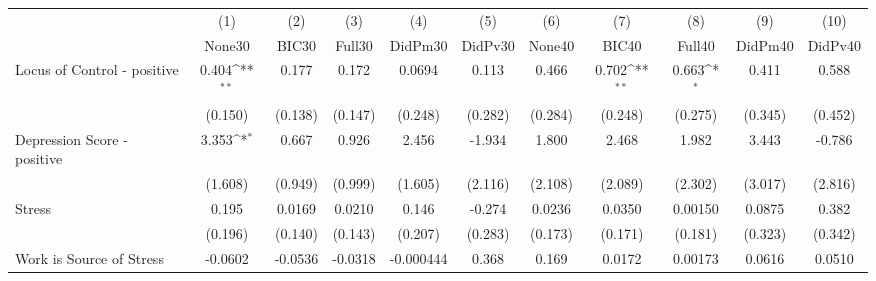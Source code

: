{
\def\sym#1{\ifmmode^{#1}\else\(^{#1}\)\fi}
\begin{tabular}{l*{10}{c}}
\toprule
            &\multicolumn{1}{c}{(1)}&\multicolumn{1}{c}{(2)}&\multicolumn{1}{c}{(3)}&\multicolumn{1}{c}{(4)}&\multicolumn{1}{c}{(5)}&\multicolumn{1}{c}{(6)}&\multicolumn{1}{c}{(7)}&\multicolumn{1}{c}{(8)}&\multicolumn{1}{c}{(9)}&\multicolumn{1}{c}{(10)}\\
            &\multicolumn{1}{c}{None30}&\multicolumn{1}{c}{BIC30}&\multicolumn{1}{c}{Full30}&\multicolumn{1}{c}{DidPm30}&\multicolumn{1}{c}{DidPv30}&\multicolumn{1}{c}{None40}&\multicolumn{1}{c}{BIC40}&\multicolumn{1}{c}{Full40}&\multicolumn{1}{c}{DidPm40}&\multicolumn{1}{c}{DidPv40}\\
\midrule
Locus of Control - positive&       0.404\sym{**} &       0.177         &       0.172         &      0.0694         &       0.113         &       0.466         &       0.702\sym{**} &       0.663\sym{*}  &       0.411         &       0.588         \\
            &     (0.150)         &     (0.138)         &     (0.147)         &     (0.248)         &     (0.282)         &     (0.284)         &     (0.248)         &     (0.275)         &     (0.345)         &     (0.452)         \\
\addlinespace
Depression Score - positive&       3.353\sym{*}  &       0.667         &       0.926         &       2.456         &      -1.934         &       1.800         &       2.468         &       1.982         &       3.443         &      -0.786         \\
            &     (1.608)         &     (0.949)         &     (0.999)         &     (1.605)         &     (2.116)         &     (2.108)         &     (2.089)         &     (2.302)         &     (3.017)         &     (2.816)         \\
\addlinespace
Stress      &       0.195         &      0.0169         &      0.0210         &       0.146         &      -0.274         &      0.0236         &      0.0350         &     0.00150         &      0.0875         &       0.382         \\
            &     (0.196)         &     (0.140)         &     (0.143)         &     (0.207)         &     (0.283)         &     (0.173)         &     (0.171)         &     (0.181)         &     (0.323)         &     (0.342)         \\
\addlinespace
Work is Source of Stress&     -0.0602         &     -0.0536         &     -0.0318         &   -0.000444         &       0.368         &       0.169         &      0.0172         &     0.00173         &      0.0616         &      0.0510         \\

\end{tabular}}
